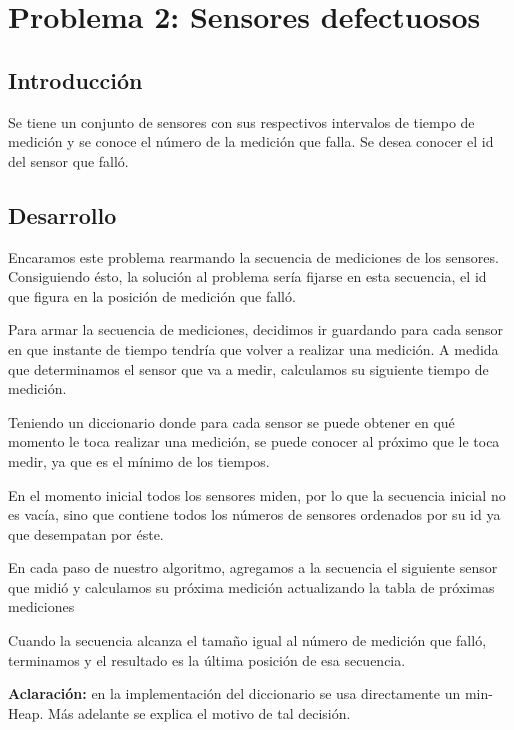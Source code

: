 \section{Problema 2: Sensores defectuosos}

\subsection{Introducci\'on}

\quad Se tiene un conjunto de sensores con sus respectivos intervalos de tiempo de medici\'on y se conoce el n\'umero de la medici\'on que falla. Se desea conocer el id del sensor que fall\'o. 

\subsection{Desarrollo}

\quad Encaramos este problema rearmando la secuencia de mediciones de los sensores. Consiguiendo \'esto, la soluci\'on al problema ser\'ia fijarse en esta secuencia, el id que figura en la posici\'on de medici\'on que fall\'o.


\quad Para armar la secuencia de mediciones, decidimos ir guardando para cada sensor en que instante de tiempo tendr\'ia que volver a realizar una medici\'on. A medida que determinamos el sensor que va a medir, calculamos su siguiente tiempo de medici\'on.


\quad Teniendo un diccionario donde para cada sensor se puede obtener en qu\'e momento le toca realizar una medici\'on, se puede conocer al pr\'oximo que le toca medir, ya que es el m\'inimo de los tiempos.


\quad En el momento inicial todos los sensores miden, por lo que la secuencia inicial no es vac\'ia, sino que contiene todos los n\'umeros de sensores ordenados por su id ya que desempatan por \'este.


\quad En cada paso de nuestro algoritmo, agregamos a la secuencia el siguiente sensor que midi\'o y calculamos su pr\'oxima medici\'on actualizando la tabla de pr\'oximas mediciones


\quad Cuando la secuencia alcanza el tama\~no igual al n\'umero de medici\'on que fall\'o, terminamos y el resultado es la \'ultima posici\'on de esa secuencia.



\textbf{Aclaraci\'on:} en la implementaci\'on del diccionario se usa directamente un min-Heap. M\'as adelante se explica el motivo de tal decisi\'on.




